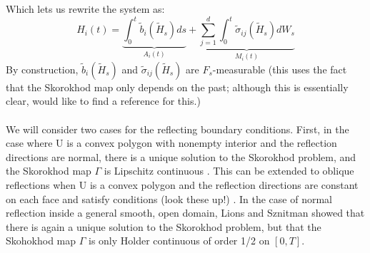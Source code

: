 \documentclass[]{article}
\theoremstyle{definition}
\theoremstyle{assumption}
\theoremstyle{remark}
\begin{document}
Which lets us rewrite the system as:
\begin{equation} \label{eq:fSDE}
H_i(t) =  \underbrace{ \int_0^t \tilde{b}_i(\tilde{H}_s) ds}_{A_i(t)}+ \underbrace{\sum_{j=1}^d \int_0^t  \tilde{\sigma}_{ij}(\tilde{H}_s)dW_s }_{M_i(t)}
\end{equation}
By construction, $\tilde{b}_i(\tilde{H}_s)$ and $\tilde{\sigma}_{ij}(\tilde{H}_s)$ are $F_s$-measurable (this uses the fact that the Skorokhod map only depends on the past; although this is essentially clear, would like to find a reference for this.) \\ \\

We will consider two cases for the reflecting boundary conditions. First, in the case where U is a convex polygon with nonempty interior and the reflection directions are normal, there is a unique solution to the Skorokhod problem, and the Skorokhod map $\Gamma$ is Lipschitz continuous \cite{Dupuis91}. This can be extended to oblique reflections when U is a convex polygon and the reflection directions are constant on each face and satisfy conditions (look these up!) \cite{Dupuis91}. In the case of normal reflection inside a general smooth, open domain, Lions and Sznitman \cite[Theorem 1.1]{Lions84} showed that there is again a unique solution to the Skorokhod problem, but that the Skohokhod map $\Gamma$ is only Holder continuous of order 1/2 on $[0, T]$.
\end{document}
